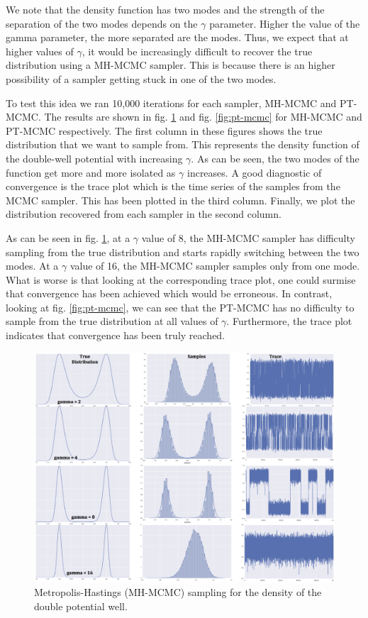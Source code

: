We note that the density function has two modes and the strength of the separation of the two modes depends on the $\gamma$ parameter. Higher the value of the gamma parameter, the more separated are the modes. Thus, we expect that at higher values of $\gamma$, it would be increasingly difficult to recover the true distribution using a MH-MCMC sampler. This is because there is an higher possibility of a sampler getting stuck in one of the two modes. 

To test this idea we ran 10,000 iterations for each sampler, MH-MCMC and PT-MCMC. The results are shown in fig. \ref{fig:mh-mcmc} and fig. \ref{fig:pt-mcmc} for MH-MCMC and PT-MCMC respectively. The first column in these figures shows the true distribution that we want to sample from. This represents the density function of the double-well potential with increasing $\gamma$. As can be seen, the two modes of the function get more and more isolated as $\gamma$ increases. A good diagnostic of convergence is the trace plot which is the time series of the samples from the MCMC sampler. This has been plotted in the third column. Finally, we plot the distribution recovered from each sampler in the second column. 

As can be seen in fig. \ref{fig:mh-mcmc}, at a $\gamma$ value of 8, the MH-MCMC sampler has difficulty sampling from the true distribution and starts rapidly switching between the two modes. At a $\gamma$ value of 16, the MH-MCMC sampler samples only from one mode. What is worse is that looking at the corresponding trace plot, one could surmise that convergence has been achieved which would be erroneous. In contrast, looking at fig. \ref{fig:pt-mcmc}, we can see that the PT-MCMC has no difficulty to sample from the true distribution at all values of $\gamma$. Furthermore, the trace plot indicates that convergence has been truly reached. 

\begin{figure}[h!]
\centering
\includegraphics[scale=0.55]{tex/embryo/dble_potn_well.png}
\caption{Metropolis-Hastings (MH-MCMC) sampling for the density of the double potential well.}
\label{fig:mh-mcmc}
\end{figure}

